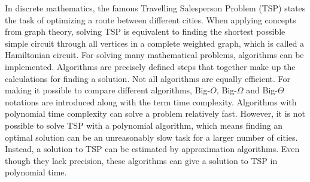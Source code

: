 
In discrete mathematics, the famous Travelling Salesperson Problem (TSP) states the task of optimizing a route between different cities. 
When applying concepts from graph theory, solving TSP is equivalent to finding the shortest possible simple circuit through all vertices in a complete weighted graph, which is called a Hamiltonian circuit. 
For solving many mathematical problems, algorithms can be implemented. Algorithms are precisely defined steps that together make up the calculations for finding a solution. 
Not all algorithms are equally efficient. For making it possible to compare different algorithms, Big-$O$, Big-$\Omega$ and Big-$\Theta$ notations are introduced along with the term time complexity. 
Algorithms with polynomial time complexity can solve a problem relatively fast. 
However, it is not possible to solve TSP with a polynomial algorithm, which means finding an optimal solution can be an unreasonably slow task for a larger number of cities. 
Instead, a solution to TSP can be estimated by approximation algorithms.
Even though they lack precision, these algorithms can give a solution to TSP in polynomial time. 
